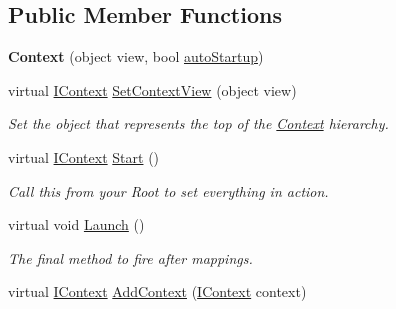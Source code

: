 \subsection*{Public Member Functions}
\begin{DoxyCompactItemize}
\item 
\hypertarget{classstrange_1_1extensions_1_1context_1_1impl_1_1_context_a771c415dd8d8ee10fa09d5906318ff9c}{{\bfseries Context} (object view, bool \hyperlink{classstrange_1_1extensions_1_1context_1_1impl_1_1_context_a3386ea2967ba720218b89eaefac77d56}{auto\-Startup})}\label{classstrange_1_1extensions_1_1context_1_1impl_1_1_context_a771c415dd8d8ee10fa09d5906318ff9c}

\item 
virtual \hyperlink{interfacestrange_1_1extensions_1_1context_1_1api_1_1_i_context}{I\-Context} \hyperlink{classstrange_1_1extensions_1_1context_1_1impl_1_1_context_a376f83ac4bf2233eedbc760f1aeddccd}{Set\-Context\-View} (object view)
\begin{DoxyCompactList}\small\item\em Set the object that represents the top of the \hyperlink{classstrange_1_1extensions_1_1context_1_1impl_1_1_context}{Context} hierarchy. \end{DoxyCompactList}\item 
\hypertarget{classstrange_1_1extensions_1_1context_1_1impl_1_1_context_a29da25935b72076b614409b2a3bf5ba0}{virtual \hyperlink{interfacestrange_1_1extensions_1_1context_1_1api_1_1_i_context}{I\-Context} \hyperlink{classstrange_1_1extensions_1_1context_1_1impl_1_1_context_a29da25935b72076b614409b2a3bf5ba0}{Start} ()}\label{classstrange_1_1extensions_1_1context_1_1impl_1_1_context_a29da25935b72076b614409b2a3bf5ba0}

\begin{DoxyCompactList}\small\item\em Call this from your Root to set everything in action. \end{DoxyCompactList}\item 
virtual void \hyperlink{classstrange_1_1extensions_1_1context_1_1impl_1_1_context_a02c426aaa7b4cdae6bc1be3060b67dce}{Launch} ()
\begin{DoxyCompactList}\small\item\em The final method to fire after mappings. \end{DoxyCompactList}\item 
\hypertarget{classstrange_1_1extensions_1_1context_1_1impl_1_1_context_abf74ff8fea03ac9760c7fe18d62d59b8}{virtual \hyperlink{interfacestrange_1_1extensions_1_1context_1_1api_1_1_i_context}{I\-Context} \hyperlink{classstrange_1_1extensions_1_1context_1_1impl_1_1_context_abf74ff8fea03ac9760c7fe18d62d59b8}{Add\-Context} (\hyperlink{interfacestrange_1_1extensions_1_1context_1_1api_1_1_i_context}{I\-Context} context)}\label{classstrange_1_1extensions_1_1context_1_1impl_1_1_context_abf74ff8fea03ac9760c7fe18d62d59b8}


\end{DoxyCompactItemize}

